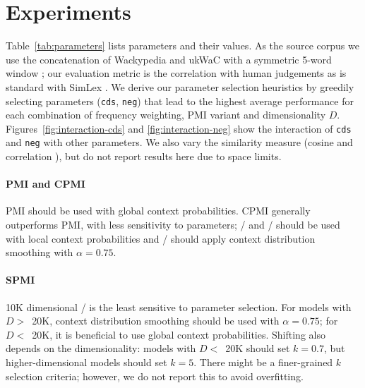\documentclass[11pt]{article}
\begin{document}
\section{Experiments}
\label{sec:lexical-experiments}

Table~\ref{tab:parameters} lists parameters and their values. As the source corpus we use the concatenation of Wackypedia and ukWaC \cite{Baroni2009} with a symmetric 5-word window \cite{milajevs-EtAl:2014:EMNLP2014}; our evaluation metric is the correlation with human judgements as is standard with SimLex \cite{hill2014simlex}. We derive our parameter selection heuristics by greedily selecting parameters (\texttt{cds}, \texttt{neg}) that lead to the highest average performance for each combination of frequency weighting, PMI variant and dimensionality $D$. Figures~\ref{fig:interaction-cds} and \ref{fig:interaction-neg} show the interaction of \texttt{cds} and \texttt{neg} with other parameters. We also vary the similarity measure (cosine and correlation  \cite{kiela-clark:2014:CVSC}), but do not report results here due to space limits.\footnotemark{}


\paragraph{PMI and CPMI}

PMI should be used with global context probabilities. CPMI generally outperforms PMI, with less sensitivity to parameters; \NCPMI/ and \logNCPMI/ should be used with local context probabilities and \CPMI/ should apply context distribution smoothing with $\alpha = 0.75$.



\paragraph{SPMI}

10K dimensional \SPMI/ is the least sensitive to parameter selection. For models with $D>$~20K, context distribution smoothing should be used with $\alpha = 0.75$; for $D<$~20K, it is beneficial to use global context probabilities. Shifting also depends on the dimensionality: models with $D<$~20K should set $k = 0.7$, but higher-dimensional models should set $k = 5$. There might be a finer-grained $k$ selection criteria; however, we do not report this to avoid overfitting.
\end{document}

